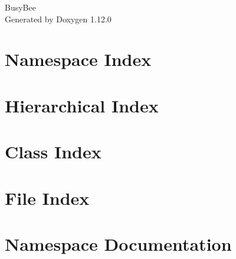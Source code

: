\documentclass[twoside]{book}
\newcommand{\+}{\discretionary{\mbox{\scriptsize$\hookleftarrow$}}{}{}}
\newcommand{\clearemptydoublepage}{%
    \newpage{\pagestyle{empty}\cleardoublepage}%
  }
\begin{document}
  \raggedbottom
    \hypersetup{pageanchor=false,
                bookmarksnumbered=true,
                pdfencoding=unicode
               }
  \begin{titlepage}
  \vspace*{7cm}
  \begin{center}%
  {\Large Busy\+Bee}\\
  \vspace*{1cm}
  {\large Generated by Doxygen 1.12.0}\\
  \end{center}
  \end{titlepage}
  \clearemptydoublepage
  \tableofcontents
  \clearemptydoublepage
  \hypersetup{pageanchor=true}
\chapter{Namespace Index}

\chapter{Hierarchical Index}

\chapter{Class Index}

\chapter{File Index}

\chapter{Namespace Documentation}























\end{document}

